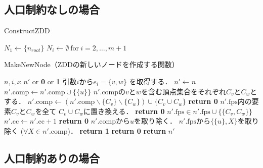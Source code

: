 \subsection{人口制約なしの場合}

\begin{algorithm}
  \caption{ConstructZDD}
  \label{construct_zdd}
  \begin{algorithmic}[1]
    \State $N_1 \gets \{n_{root}\}$
    \State $N_i \gets \emptyset~\mathrm{for}~i=2, \ldots ,m+1$
        
      \EndFor
    \EndFor
  \end{algorithmic}
\end{algorithm}

\begin{breakablealgorithm}
  \caption{MakeNewNode（ZDDの新しいノードを作成する関数）}
  \label{make_new_node}
  \begin{algorithmic}[1]
    \Require $n,i,x$
    \Ensure $n'$ or \textbf{0} or \textbf{1}
    \State 引数$i$から$e_i=\{v,w\}$ を取得する．
    \State $n' \gets n$
        \State $n'.\mathrm{comp} \gets n'.\mathrm{comp} \cup \{\{u\}\}$
      \EndIf
    \EndFor
    \State $n'.\mathrm{comp}$の$v$と$w$を含む頂点集合をそれぞれ$C_v$と$C_w$とする．
      \State $n'.\mathrm{comp} \gets (n'.\mathrm{comp} \backslash \{C_v\} \backslash \{C_w\})
        \cup \{C_v \cup C_w\}$
        \State \textbf{return 0}
      \Else
        \State $n'.\mathrm{fps}$内の要素$C_v$と$C_w$を全て
          $C_v \cup C_w$に置き換える．
      \EndIf
    \Else
        \State \textbf{return 0}
      \Else
        \State $n'.\mathrm{fps} \in n'.\mathrm{fps} \cup \{\{C_v, C_w\}\}$
      \EndIf
    \EndIf
        \State $n'.\mathrm{cc} \gets n'.\mathrm{cc} + 1$
          \State \textbf{return 0}
        \EndIf
      \EndIf
      \State $n'.\mathrm{comp}$から$u$を取り除く．
      \State $n'.\mathrm{fps}$から$\{\{u\},X\}$を取り除く
        ($\forall X \in n'.\mathrm{comp}$)．
    \EndIf
  \EndFor
      \State \textbf{return 1}
    \Else
      \State \State \textbf{return 0}
    \EndIf
  \EndIf
  \State \textbf{return }$n'$
  \end{algorithmic}
\end{breakablealgorithm}

\subsection{人口制約ありの場合}
